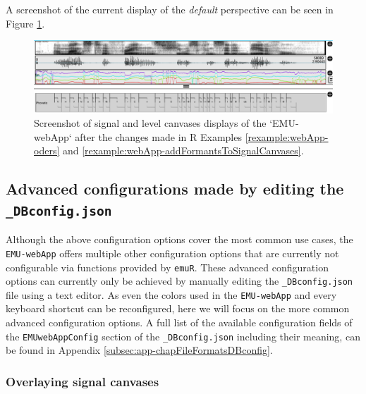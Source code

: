 \documentclass[]{book}
\theoremstyle{definition}
\theoremstyle{definition}
\theoremstyle{definition}
\theoremstyle{remark}
\begin{document}
A screenshot of the current display of the \emph{default} perspective
can be seen in Figure \ref{fig:webApp-postOderChange}.

\begin{figure}

{\centering \includegraphics[width=1\linewidth]{pics/emu-webAppPostOderChange} 

}

\caption{Screenshot of signal and level canvases displays of the `EMU-webApp` after the changes made in R Examples \ref{rexample:webApp-oders} and \ref{rexample:webApp-addFormantsToSignalCanvases}.}\label{fig:webApp-postOderChange}
\end{figure}

\hypertarget{subsec:emu-webAppAdvancedConfig}{%
\subsection{\texorpdfstring{Advanced configurations made by editing the
\texttt{\_DBconfig.json}}{Advanced configurations made by editing the \_DBconfig.json}}\label{subsec:emu-webAppAdvancedConfig}}

Although the above configuration options cover the most common use
cases, the \texttt{EMU-webApp} offers multiple other configuration
options that are currently not configurable via functions provided by
\texttt{emuR}. These advanced configuration options can currently only
be achieved by manually editing the \texttt{\_DBconfig.json} file using
a text editor. As even the colors used in the \texttt{EMU-webApp} and
every keyboard shortcut can be reconfigured, here we will focus on the
more common advanced configuration options. A full list of the available
configuration fields of the \texttt{EMUwebAppConfig} section of the
\texttt{\_DBconfig.json} including their meaning, can be found in
Appendix \ref{subsec:app-chapFileFormatsDBconfig}.

\hypertarget{overlaying-signal-canvases}{%
\subsubsection{Overlaying signal
canvases}\label{overlaying-signal-canvases}}
\end{document}
